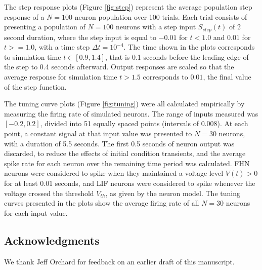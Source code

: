 \documentclass[12pt]{article}
\newcommand{\fig}[1]{Figure \ref{fig:#1}}
\begin{document}
The step response plots (\fig{step}) represent the average population step response of a $N = 100$ neuron population over 100 trials. Each trial consists of presenting a population of $N = 100$ neurons with a step input $S_{step}(t)$ of 2 second duration, where the step input is equal to $-0.01$ for $t < 1.0$ and $0.01$ for $t >= 1.0$, with a time step $\Delta t = 10^{-4}$. The time shown in the plots corresponds to simulation time $t \in [0.9, 1.4]$, that is 0.1 seconds before the leading edge of the step to 0.4 seconds afterward. Output responses are scaled so that the average response for simulation time $t > 1.5$ corresponds to $0.01$, the final value of the step function.

The tuning curve plots (\fig{tuning}) were all calculated empirically by measuring the firing rate of simulated neurons. The range of inputs measured was $[-0.2, 0.2]$, divided into 51 equally spaced points (intervals of $0.008$). At each point, a constant signal at that input value was presented to $N = 30$ neurons, with a duration of 5.5 seconds. The first 0.5 seconds of neuron output was discarded, to reduce the effects of initial condition transients, and the average spike rate for each neuron over the remaining time period was calculated. FHN neurons were considered to spike when they maintained a voltage level $V(t) > 0$ for at least 0.01 seconds, and LIF neurons were considered to spike whenever the voltage crossed the threshold $V_{th}$, as given by the neuron model. The tuning curves presented in the plots show the average firing rate of all $N = 30$ neurons for each input value.

\subsection*{Acknowledgments}

We thank Jeff Orchard for feedback on an earlier draft of this manuscript.
\end{document}
